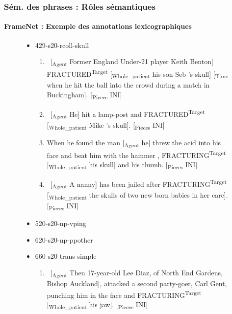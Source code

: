\documentclass[xcolor=table]{beamer}
\begin{document}
\begin{frame}
	\frametitle{Sém. des phrases : Rôles sémantiques}
	\framesubtitle{FrameNet : Exemple des annotations lexicographiques}
	
	\vspace{-6pt}
	\begin{figure}
		\tiny\bfseries
		
		\begin{itemize}
			\item 429-s20-rcoll-skull
			\begin{enumerate}\tiny
				\item \ [\textsubscript{\color{red}Agent} Former England Under-21 player Keith Benton] FRACTURED\textsuperscript{\color{red}Target} [\textsubscript{\color{red}Whole\_patient} his son Seb 's skull] [\textsubscript{\color{red}Time} when he hit the ball into the crowd during a match in Buckingham]. [\textsubscript{\color{red}Pieces} INI] 
				\item \ [\textsubscript{\color{red}Agent} He] hit a lamp-post and FRACTURED\textsuperscript{\color{red}Target} [\textsubscript{\color{red}Whole\_patient} Mike 's skull]. [\textsubscript{\color{red}Pieces} INI] 
				\item When he found the man [\textsubscript{\color{red}Agent} he] threw the acid into his face and beat him with the hammer , FRACTURING\textsuperscript{\color{red}Target} [\textsubscript{\color{red}Whole\_patient} his skull] and his thumb. [\textsubscript{\color{red}Pieces} INI] 
				\item \ [\textsubscript{\color{red}Agent} A nanny] has been jailed after FRACTURING\textsuperscript{\color{red}Target} [\textsubscript{\color{red}Whole\_patient} the skulls of two new born babies in her care]. [\textsubscript{\color{red}Pieces} INI] 
			\end{enumerate}
			\item 520-s20-np-vping
			\item 620-s20-np-ppother
			\item 660-s20-trans-simple
			\begin{enumerate}\tiny
				\item \ [\textsubscript{\color{red}Agent} Then 17-year-old Lee Diaz, of North End Gardens, Bishop Auckland], attacked a second party-goer, Carl Gent, punching him in the face and FRACTURING\textsuperscript{\color{red}Target} [\textsubscript{\color{red}Whole\_patient} his jaw]. [\textsubscript{\color{red}Pieces} INI] 
			\end{enumerate}
			

\end{itemize}
\end{figure}
\end{frame}
\end{document}
